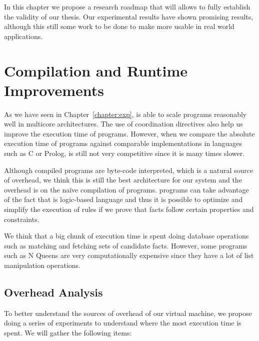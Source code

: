 
In this chapter we propose a research roadmap that will allows to fully establish the validity of our thesis.
Our experimental results have shown promising results, although this still some work to be done to make
\lang more usable in real world applications.

\section{Compilation and Runtime Improvements}

As we have seen in Chapter~\ref{chapter:exp}, \lang is able to scale programs reasonably well
in multicore architectures.
The use of coordination directives also help us improve the execution time of programs. However,
when we compare the absolute execution time of programs against comparable implementations in
languages such as C or Prolog, \lang is still not very competitive since it is many times slower.

Although compiled \lang programs are byte-code interpreted, which is a natural
source of overhead, we think this is still the best architecture for our system and the overhead
is on the naïve compilation of programs. \lang programs can take advantage of the fact that
\lang is logic-based language and thus it is possible to optimize and simplify the execution of rules
if we prove that facts follow certain properties and constraints.

We think that a big chunk of execution time is spent doing
database operations such as matching and fetching sets of candidate facts.
However, some programs such as N Queens are very computationally expensive since they have
a lot of list manipulation operations.

\subsection{Overhead Analysis}

To better understand the sources of overhead of our virtual machine, we propose doing a series
of experiments to understand where the most execution time is spent. We will gather the following
items:

